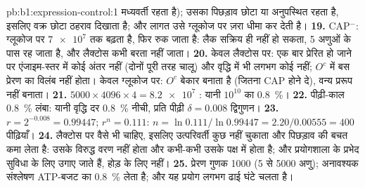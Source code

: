 \begin{solution}{pb:b1:expression-control:1}
मध्यवर्ती रहता है); उसका पिछड़ाव छोटा या अनुपस्थित रहता है, इसलिए वक्र
छोटा ठहराव दिखाता है; और लागत उसे ग्लूकोज पर ज़रा धीमा कर देती है।
\textbf{19.} CAP$^-$: ग्लूकोज पर $\num{7e7}$ तक बढ़ता है, फिर रुक जाता
है: लैक  सक्रिय ही नहीं हो सकता,  5 अणुओं के पास रह जाता है,
और लैक्टोस कभी बरता नहीं जाता।
\textbf{20.} केवल लैक्टोस पर: एक बार प्रेरित हो जाने पर एंजाइम-स्तर में
कोई अंतर नहीं (दोनों पूरी तरह चालू) और वृद्धि में भी लगभग कोई नहीं;
$O^c$ में बस प्रेरण का विलंब नहीं होता। केवल ग्लूकोज पर: $O^c$ 
बेकार बनाता है (जितना CAP होने दे), वन्य प्ररूप नहीं बनाता।
\textbf{21.} $5000\times 4096\times 4 = \num{8.2e7}$ : यानी
$10^{10}$ का \qty{0.8}{\%}।
\textbf{22.} पीढ़ी-काल \qty{0.8}{\%} लंबा: यानी वृद्धि दर
\qty{0.8}{\%} नीची, प्रति पीढ़ी $\delta = 0.008$ द्विगुणन।
\textbf{23.} $r = 2^{-0.008} = 0.99447$; $r^n = 0.111$: $n =
\ln 0.111/\ln 0.99447 = 2.20/0.00555 = 400$ पीढ़ियाँ।
\textbf{24.} लैक्टोस पर  वैसे भी चाहिए, इसलिए उत्परिवर्ती कुछ
नहीं चुकाता और पिछड़ाव की बचत कमा लेता है: उसके विरुद्ध वरण नहीं होता और
कभी-कभी उसके पक्ष में होता है; और प्रयोगशाला के प्रभेद सुविधा के लिए
उगाए जाते हैं, होड़ के लिए नहीं।
\textbf{25.} प्रेरण गुणक 1000 (5 से \num{5000} अणु);
अनावश्यक संश्लेषण ATP-बजट का \qty{0.8}{\%} लेता है; और यह
प्रयोग लगभग ढाई घंटे चलता है।
\end{solution}
